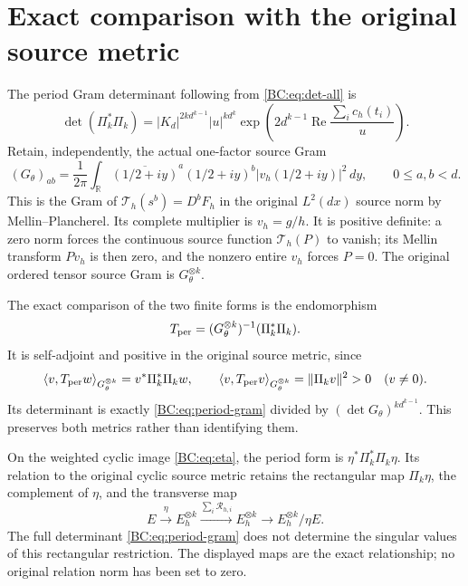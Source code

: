 \section{Exact comparison with the original source metric}

The period Gram determinant following from \eqref{BC:eq:det-all} is
\begin{equation}
 \det(\Pi_k^*\Pi_k)=|K_d|^{2k d^{k-1}}|u|^{k d^k}
    \exp\!\left(2d^{k-1}\operatorname{Re}
                    \frac{\sum_i c_h(t_i)}u\right).
 \label{BC:eq:period-gram}
\end{equation}
Retain, independently, the actual one-factor source Gram
\begin{equation}
 (G_\theta)_{ab}=\frac1{2\pi}\int_{\mathbb R}
     \overline{(1/2+iy)}^{a}(1/2+iy)^b
       |v_h(1/2+iy)|^2\,dy,\qquad 0\le a,b<d.
 \label{BC:eq:theta-gram}
\end{equation}
This is the Gram of $\mathcal T_h(s^b)=D^bF_h$ in the original
$L^2(dx)$ source norm by Mellin--Plancherel.  Its complete multiplier is
$v_h=g/h$.  It is positive definite: a zero norm forces the continuous
source function $\mathcal T_h(P)$ to vanish; its Mellin transform
$Pv_h$ is then zero, and the nonzero entire $v_h$ forces $P=0$.
The original ordered tensor source Gram is $G_\theta^{\otimes k}$.

The exact comparison of the two finite forms is the endomorphism
\begin{equation}
 T_{\rm per}=(G_\theta^{\otimes k})^{-1}(\Pi_k^*\Pi_k).
 \label{BC:eq:metric-map}
\end{equation}
It is self-adjoint and positive in the original source metric, since
\[
 \langle v,T_{\rm per}w\rangle_{G_\theta^{\otimes k}}
     =v^*\Pi_k^*\Pi_k w,
 \qquad
 \langle v,T_{\rm per}v\rangle_{G_\theta^{\otimes k}}
     =\|\Pi_kv\|^2>0\quad(v\ne0).
\]
Its determinant is exactly \eqref{BC:eq:period-gram} divided by
$(\det G_\theta)^{k d^{k-1}}$.  This preserves both metrics rather
than identifying them.

On the weighted cyclic image \eqref{BC:eq:eta}, the period form is
$\eta^*\Pi_k^*\Pi_k\eta$.  Its relation to the original cyclic
source metric retains the rectangular map $\Pi_k\eta$, the complement
of $\eta$, and the transverse map
\[
 E\xrightarrow{\eta}E_h^{\otimes k}
 \xrightarrow{\sum_i\mathcal R_{h,i}}E_h^{\otimes k}
 \longrightarrow E_h^{\otimes k}/\eta E.
\]
The full determinant \eqref{BC:eq:period-gram} does not determine the
singular values of this rectangular restriction.  The displayed maps
are the exact relationship; no original relation norm has been set to
zero.

